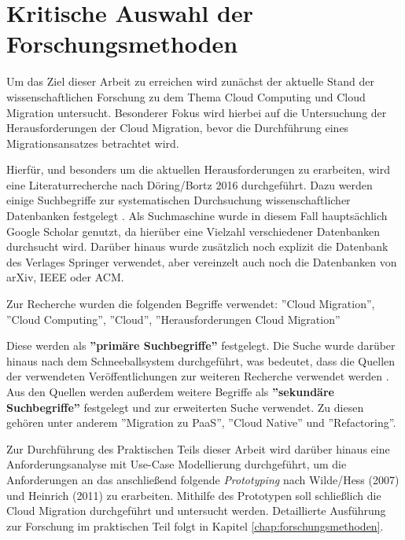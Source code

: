 \section{Kritische Auswahl der Forschungsmethoden}
\label{sec:auswahl_forschungsmethoden}


Um das Ziel dieser Arbeit zu erreichen wird zunächst der aktuelle Stand der wissenschaftlichen Forschung zu dem Thema Cloud Computing und Cloud Migration untersucht. Besonderer Fokus wird hierbei auf die Untersuchung der Herausforderungen der Cloud Migration, bevor die Durchführung eines Migrationsansatzes betrachtet wird.

Hierfür, und besonders um die aktuellen Herausforderungen zu erarbeiten, wird eine Literaturrecherche nach Döring/Bortz 2016 durchgeführt. Dazu werden einige Suchbegriffe zur systematischen Durchsuchung wissenschaftlicher Datenbanken festgelegt \cite[Vgl.][S. 158]{Doering2016}. Als Suchmaschine wurde in diesem Fall hauptsächlich Google Scholar genutzt, da hierüber eine Vielzahl verschiedener Datenbanken durchsucht wird. Darüber hinaus wurde zusätzlich noch explizit die Datenbank des Verlages Springer verwendet, aber vereinzelt auch noch die Datenbanken von arXiv, IEEE oder ACM.

Zur Recherche wurden die folgenden Begriffe verwendet: ''Cloud Migration'', ''Cloud Computing'', ''Cloud'', ''Herausforderungen Cloud Migration''

Diese werden als \textbf{''primäre Suchbegriffe''} \cite[S. 158]{Doering2016} festgelegt. Die Suche wurde darüber hinaus nach dem Schneeballsystem durchgeführt, was bedeutet, dass die Quellen der verwendeten Veröffentlichungen zur weiteren Recherche verwendet werden \cite[Vgl.][S. 160]{Doering2016}. Aus den Quellen werden außerdem weitere Begriffe als \textbf{''sekundäre Suchbegriffe''} \cite[S. 158]{Doering2016} festgelegt und zur erweiterten Suche verwendet. Zu diesen gehören unter anderem ''Migration zu PaaS'', ''Cloud Native'' und ''Refactoring''.

Zur Durchführung des Praktischen Teils dieser Arbeit wird darüber hinaus eine Anforderungsanalyse mit Use-Case Modellierung durchgeführt, um die Anforderungen an das anschließend folgende \textit{Prototyping} nach Wilde/Hess (2007) und Heinrich (2011) zu erarbeiten. Mithilfe des Prototypen soll schließlich die Cloud Migration durchgeführt und untersucht werden. Detaillierte Ausführung zur Forschung im praktischen Teil folgt in Kapitel \ref{chap:forschungsmethoden}.